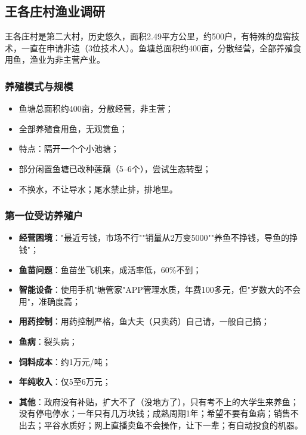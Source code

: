 \documentclass[12pt,a4paper]{article}
\begin{document}
\subsection{王各庄村渔业调研}

王各庄村是第二大村，历史悠久，面积2.49平方公里，约500户，有特殊的盘窑技术，一直在申请非遗（3位技术人）。鱼塘总面积约400亩，分散经营，全部养殖食用鱼，渔业为非主营产业。

\subsubsection{养殖模式与规模}

\begin{itemize}[leftmargin=2em]
    \item 鱼塘总面积约400亩，分散经营，非主营；
    \item 全部养殖食用鱼，无观赏鱼；
    \item 特点：隔开一个个小池塘；
    \item 部分闲置鱼塘已改种莲藕（5--6个），尝试生态转型；
    \item 不换水，不让导水；尾水禁止排，排地里。
\end{itemize}

\subsubsection{第一位受访养殖户}

\begin{itemize}[leftmargin=2em]
    \item \textbf{经营困境}："最近亏钱，市场不行""销量从2万变5000""养鱼不挣钱，导鱼的挣钱"；
    \item \textbf{鱼苗问题}：鱼苗坐飞机来，成活率低，60\%不到；
    \item \textbf{智能设备}：使用手机"塘管家"APP管理水质，年费100多元，但"岁数大的不会用"，准确度高；
    \item \textbf{用药控制}：用药控制严格，鱼大夫（只卖药）自己请，一般自己搞；
    \item \textbf{鱼病}：裂头病；
    \item \textbf{饲料成本}：约1万元/吨；
    \item \textbf{年纯收入}：仅5至6万元；
    \item \textbf{其他}：政府没有补贴，扩大不了（没地方了），只有考不上的大学生来养鱼；没有停电停水；一年只有几万块钱；成熟周期1年；希望不要有鱼病；销售不出去；平谷水质好；网上直播卖鱼不会操作，让下一辈；有自动投食的机器。
\end{itemize}
\end{document}
